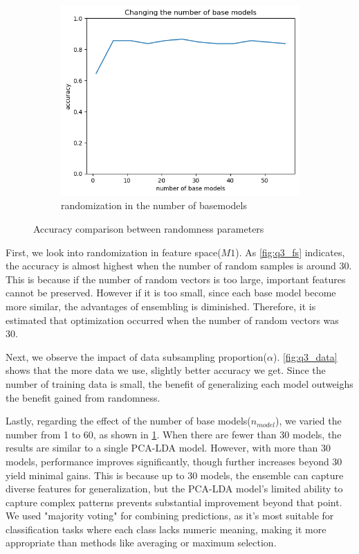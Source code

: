 \begin{figure}[htbp]
\begin{subfigure}[t]{0.3\linewidth}
		\centering
		\includegraphics[width=\linewidth]{image/q3_basemodel.png}
		\caption{randomization in the number of basemodels}
		\label{fig:q3_base}
	\end{subfigure}
	\caption{Accuracy comparison between randomness parameters}
	\label{fig:q3_random}
\end{figure}
\vspace{-0.2cm}

First, we look into randomization in feature space($M1$). As \cref{fig:q3_fs} indicates, the accuracy is almost highest when the number of random samples is around 30. This is because if the number of random vectors is too large, important features cannot be preserved. However if it is too small, since each base model become more similar, the advantages of ensembling is diminished. Therefore, it is estimated that optimization occurred when the number of random vectors was 30.

Next, we observe the impact of data subsampling proportion($\alpha$). \cref{fig:q3_data} shows that the more data we use, slightly better accuracy we get. Since the number of training data is small, the benefit of generalizing each model outweighs the benefit gained from randomness.

Lastly, regarding the effect of the number of base models($n_{model}$), we varied the number from 1 to 60, as shown in \cref{fig:q3_base}. When there are fewer than 30 models, the results are similar to a single PCA-LDA model. However, with more than 30 models, performance improves significantly, though further increases beyond 30 yield minimal gains. This is because up to 30 models, the ensemble can capture diverse features for generalization, but the PCA-LDA model’s limited ability to capture complex patterns prevents substantial improvement beyond that point. We used "majority voting" for combining predictions, as it’s most suitable for classification tasks where each class lacks numeric meaning, making it more appropriate than methods like averaging or maximum selection.


